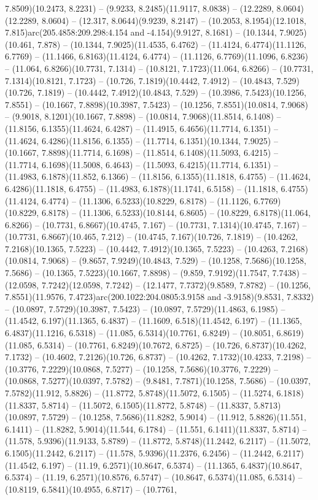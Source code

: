 7.8509)(10.2473, 8.2231) -- (9.9233, 8.2485)(11.9117, 8.0838) -- (12.2289, 8.0604)(12.2289, 8.0604) -- (12.317, 8.0644)(9.9239, 8.2147) -- (10.2053, 8.1954)(12.1018, 7.815)arc(205.4858:209.298:4.154 and -4.154)(9.9127, 8.1681) -- (10.1344, 7.9025)(10.461, 7.878) -- (10.1344, 7.9025)(11.4535, 6.4762) -- (11.4124, 6.4774)(11.1126, 6.7769) -- (11.1466, 6.8163)(11.4124, 6.4774) -- (11.1126, 6.7769)(11.1096, 6.8236) -- (11.064, 6.8266)(10.7731, 7.1314) -- (10.8121, 7.1723)(11.064, 6.8266) -- (10.7731, 7.1314)(10.8121, 7.1723) -- (10.726, 7.1819)(10.4442, 7.4912) -- (10.4843, 7.529)(10.726, 7.1819) -- (10.4442, 7.4912)(10.4843, 7.529) -- (10.3986, 7.5423)(10.1256, 7.8551) -- (10.1667, 7.8898)(10.3987, 7.5423) -- (10.1256, 7.8551)(10.0814, 7.9068) -- (9.9018, 8.1201)(10.1667, 7.8898) -- (10.0814, 7.9068)(11.8514, 6.1408) -- (11.8156, 6.1355)(11.4624, 6.4287) -- (11.4915, 6.4656)(11.7714, 6.1351) -- (11.4624, 6.4286)(11.8156, 6.1355) -- (11.7714, 6.1351)(10.1344, 7.9025) -- (10.1667, 7.8898)(11.7714, 6.1698) -- (11.8514, 6.1408)(11.5093, 6.4215) -- (11.7714, 6.1698)(11.5008, 6.4643) -- (11.5093, 6.4215)(11.7714, 6.1351) -- (11.4983, 6.1878)(11.852, 6.1366) -- (11.8156, 6.1355)(11.1818, 6.4755) -- (11.4624, 6.4286)(11.1818, 6.4755) -- (11.4983, 6.1878)(11.1741, 6.5158) -- (11.1818, 6.4755)(11.4124, 6.4774) -- (11.1306, 6.5233)(10.8229, 6.8178) -- (11.1126, 6.7769)(10.8229, 6.8178) -- (11.1306, 6.5233)(10.8144, 6.8605) -- (10.8229, 6.8178)(11.064, 6.8266) -- (10.7731, 6.8667)(10.4745, 7.167) -- (10.7731, 7.1314)(10.4745, 7.167) -- (10.7731, 6.8667)(10.465, 7.212) -- (10.4745, 7.167)(10.726, 7.1819) -- (10.4262, 7.2168)(10.1365, 7.5223) -- (10.4442, 7.4912)(10.1365, 7.5223) -- (10.4263, 7.2168)(10.0814, 7.9068) -- (9.8657, 7.9249)(10.4843, 7.529) -- (10.1258, 7.5686)(10.1258, 7.5686) -- (10.1365, 7.5223)(10.1667, 7.8898) -- (9.859, 7.9192)(11.7547, 7.7438) -- (12.0598, 7.7242)(12.0598, 7.7242) -- (12.1477, 7.7372)(9.8589, 7.8782) -- (10.1256, 7.8551)(11.9576, 7.4723)arc(200.1022:204.0805:3.9158 and -3.9158)(9.8531, 7.8332) -- (10.0897, 7.5729)(10.3987, 7.5423) -- (10.0897, 7.5729)(11.4863, 6.1985) -- (11.4542, 6.197)(11.1365, 6.4837) -- (11.1609, 6.518)(11.4542, 6.197) -- (11.1365, 6.4837)(11.1216, 6.5318) -- (11.085, 6.5314)(10.7761, 6.8249) -- (10.8051, 6.8619)(11.085, 6.5314) -- (10.7761, 6.8249)(10.7672, 6.8725) -- (10.726, 6.8737)(10.4262, 7.1732) -- (10.4602, 7.2126)(10.726, 6.8737) -- (10.4262, 7.1732)(10.4233, 7.2198) -- (10.3776, 7.2229)(10.0868, 7.5277) -- (10.1258, 7.5686)(10.3776, 7.2229) -- (10.0868, 7.5277)(10.0397, 7.5782) -- (9.8481, 7.7871)(10.1258, 7.5686) -- (10.0397, 7.5782)(11.912, 5.8826) -- (11.8772, 5.8748)(11.5072, 6.1505) -- (11.5274, 6.1818)(11.8337, 5.8714) -- (11.5072, 6.1505)(11.8772, 5.8748) -- (11.8337, 5.8713)(10.0897, 7.5729) -- (10.1258, 7.5686)(11.8282, 5.9014) -- (11.912, 5.8826)(11.551, 6.1411) -- (11.8282, 5.9014)(11.544, 6.1784) -- (11.551, 6.1411)(11.8337, 5.8714) -- (11.578, 5.9396)(11.9133, 5.8789) -- (11.8772, 5.8748)(11.2442, 6.2117) -- (11.5072, 6.1505)(11.2442, 6.2117) -- (11.578, 5.9396)(11.2376, 6.2456) -- (11.2442, 6.2117)(11.4542, 6.197) -- (11.19, 6.2571)(10.8647, 6.5374) -- (11.1365, 6.4837)(10.8647, 6.5374) -- (11.19, 6.2571)(10.8576, 6.5747) -- (10.8647, 6.5374)(11.085, 6.5314) -- (10.8119, 6.5841)(10.4955, 6.8717) -- (10.7761, 